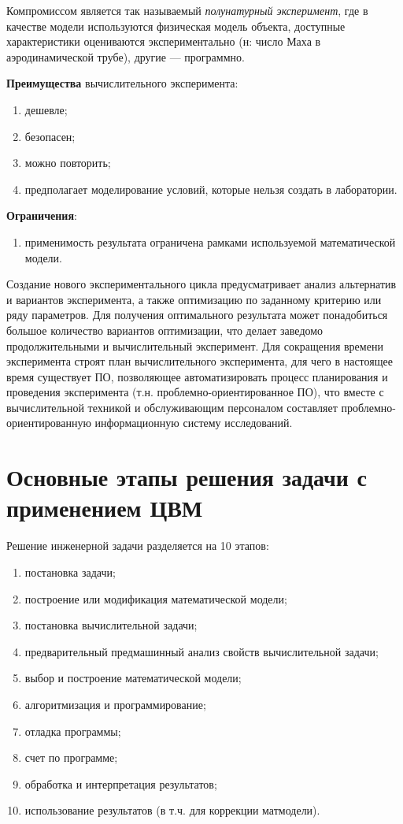 \documentclass[12pt]{article}
\begin{document}
Компромиссом является так называемый \emph{полунатурный эксперимент}, где в качестве модели используются физическая модель объекта, доступные характеристики оцениваются экспериментально (н: число Маха в аэродинамической трубе), другие --- программно.

\textbf{Преимущества} вычислительного эксперимента:
\begin{enumerate}
    \item дешевле;
    \item безопасен;
    \item можно повторить;
    \item предполагает моделирование условий, которые нельзя создать в лаборатории.
\end{enumerate}

\textbf{Ограничения}:
\begin{enumerate}
    \item применимость результата ограничена рамками используемой математической модели.
\end{enumerate}


Создание нового экспериментального цикла предусматривает анализ альтернатив и вариантов эксперимента, а также оптимизацию по заданному критерию или ряду параметров. Для получения оптимального результата может понадобиться большое количество вариантов оптимизации, что делает заведомо продолжительными и вычислительный эксперимент. Для сокращения времени эксперимента строят план вычислительного эксперимента, для чего в настоящее время существует ПО, позволяющее автоматизировать процесс планирования и проведения эксперимента (т.н. проблемно-ориентированное ПО), что вместе с вычислительной техникой и обслуживающим персоналом составляет проблемно-ориентированную информационную систему исследований.

\newpage
\section{Основные этапы решения задачи с применением ЦВМ}
Решение инженерной задачи разделяется на 10 этапов:
\begin{enumerate}
    \item постановка задачи;
    \item построение или модификация математической модели;
    \item постановка вычислительной задачи;
    \item предварительный предмашинный анализ свойств вычислительной задачи;
    \item выбор и построение математической модели;
    \item алгоритмизация и программирование;
    \item отладка программы;
    \item счет по программе;
    \item обработка и интерпретация результатов;
    \item использование результатов (в т.ч. для коррекции матмодели).
\end{enumerate}
\end{document}
